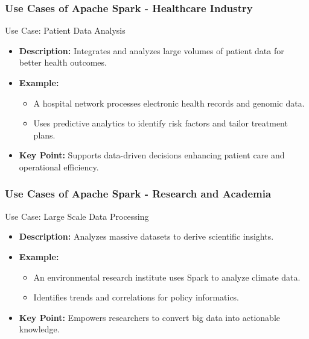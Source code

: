 \documentclass[aspectratio=169]{beamer}
\begin{document}
\begin{frame}[fragile]
    \frametitle{Use Cases of Apache Spark - Healthcare Industry}
    \begin{block}{Use Case: Patient Data Analysis}
        \begin{itemize}
            \item \textbf{Description:} Integrates and analyzes large volumes of patient data for better health outcomes.
            \item \textbf{Example:} 
                \begin{itemize}
                    \item A hospital network processes electronic health records and genomic data.
                    \item Uses predictive analytics to identify risk factors and tailor treatment plans.
                \end{itemize}
            \item \textbf{Key Point:} Supports data-driven decisions enhancing patient care and operational efficiency.
        \end{itemize}
    \end{block}
\end{frame}

\begin{frame}[fragile]
    \frametitle{Use Cases of Apache Spark - Research and Academia}
    \begin{block}{Use Case: Large Scale Data Processing}
        \begin{itemize}
            \item \textbf{Description:} Analyzes massive datasets to derive scientific insights.
            \item \textbf{Example:} 
                \begin{itemize}
                    \item An environmental research institute uses Spark to analyze climate data.
                    \item Identifies trends and correlations for policy informatics.
                \end{itemize}
            \item \textbf{Key Point:} Empowers researchers to convert big data into actionable knowledge.
        \end{itemize}
    \end{block}
\end{frame}
\end{document}
